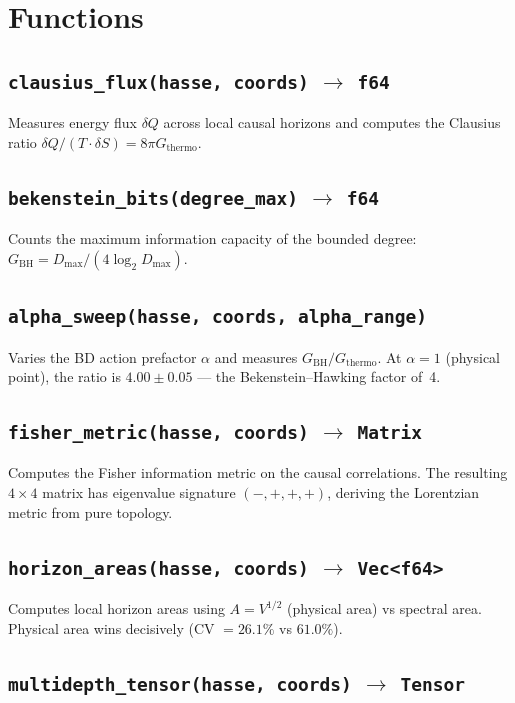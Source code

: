 \documentclass[11pt, a4paper, openany]{book}
\newcommand{\code}[1]{\texttt{#1}}
\newcommand{\func}[1]{\texttt{\color{structure}#1}}
\begin{document}
\section{Functions}

\subsection{\func{clausius\_flux(hasse, coords)} $\to$ \code{f64}}

Measures energy flux $\delta Q$ across local causal horizons and computes the
Clausius ratio $\delta Q / (T \cdot \delta S) = 8\pi G_\text{thermo}$.

\subsection{\func{bekenstein\_bits(degree\_max)} $\to$ \code{f64}}

Counts the maximum information capacity of the bounded degree:
$G_\text{BH} = D_\text{max} / (4 \log_2 D_\text{max})$.

\subsection{\func{alpha\_sweep(hasse, coords, alpha\_range)}}

Varies the BD action prefactor $\alpha$ and measures $G_\text{BH} / G_\text{thermo}$.
At $\alpha = 1$ (physical point), the ratio is $4.00 \pm 0.05$ --- the Bekenstein--Hawking
factor of~4.

\subsection{\func{fisher\_metric(hasse, coords)} $\to$ \code{Matrix}}

Computes the Fisher information metric on the causal correlations.  The resulting
$4 \times 4$ matrix has eigenvalue signature $(-,+,+,+)$, deriving the Lorentzian
metric from pure topology.

\subsection{\func{horizon\_areas(hasse, coords)} $\to$ \code{Vec<f64>}}

Computes local horizon areas using $A = V^{1/2}$ (physical area) vs spectral area.
Physical area wins decisively (CV $= 26.1\%$ vs $61.0\%$).

\subsection{\func{multidepth\_tensor(hasse, coords)} $\to$ \code{Tensor}}
\end{document}
